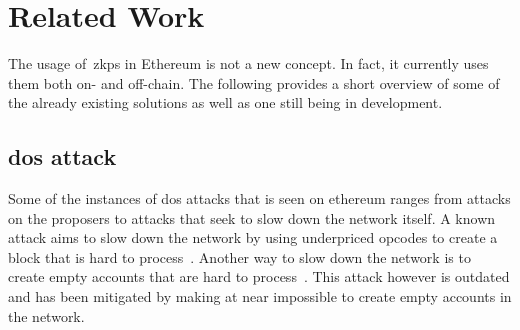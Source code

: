 

\section{Related Work}\label{sec:related-work}
The usage of~\glspl{zkp} in Ethereum is not a new concept.
In fact, it currently uses them both on- and off-chain.
The following provides a short overview of some of the already existing solutions as well as one still being in development.


%

\subsection{dos attack}\label{subsec:dos-attack}
Some of the instances of dos attacks that is seen on ethereum ranges from attacks on the proposers to attacks that seek to slow down the network itself.
A known attack aims to slow down the network by using underpriced opcodes to create a block that is hard to process~\cite{10.1145/3391195,9815256}.
Another way to slow down the network is to create empty accounts that are hard to process~\cite{empty-account-mitigation,empty-account-eip-mitigation}.
This attack however is outdated and has been mitigated by making at near impossible to create empty accounts in the network.

